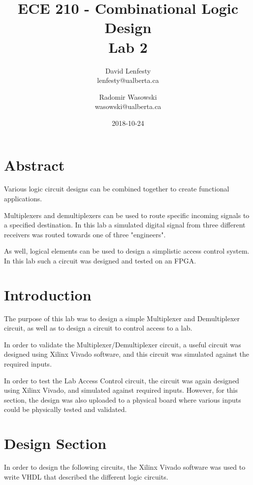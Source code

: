 \documentclass{article}
\title{ECE 210 - Combinational Logic Design \\ Lab 2}
\date{2018-10-24}
\author{David Lenfesty \\ lenfesty@ualberta.ca
    \and Radomir Wasowski \\ wasowski@ualberta.ca}
\begin{document}
    \doublespacing
    \maketitle
    \newpage

    \tableofcontents
    \newpage


    \singlespacing

    \section{Abstract}

    Various logic circuit designs can be combined together to create
    functional applications.

    Multiplexers and demultiplexers can be used to route specific
    incoming signals to a specified destination. In this lab a simulated
    digital signal from three different receivers was routed towards
    one of three "engineers".
    
    As well, logical elements can be used to design a simplistic access control system.
    In this lab such a circuit was designed and tested on an FPGA.

    \section{Introduction}

    The purpose of this lab was to design a simple Multiplexer and Demultiplexer circuit,
    as well as to design a circuit to control access to a lab.

    In order to validate the Multiplexer/Demultiplexer circuit,
    a useful circuit was designed using Xilinx Vivado software,
    and this circuit was simulated against the required inputs.

    In order to test the Lab Access Control circuit, the circuit was again designed
    using Xilinx Vivado, and simulated against required inputs.
    However, for this section, the design was also uploaded to a physical board
    where various inputs could be physically tested and validated.

    \section{Design Section}

    In order to design the following circuits, the Xilinx Vivado software
    was used to write VHDL that described the different logic circuits.
\end{document}
